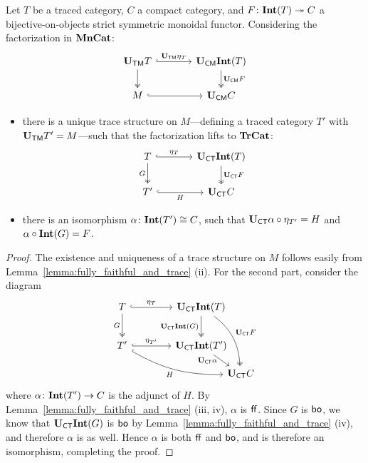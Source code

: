 \documentclass[11pt,oneside,article]{memoir}
\begin{document}
\begin{lemma}
      \label{lem:Tr_bo_Int}
   Let $T$ be a traced category, $C$ a compact category, and $F\colon\mathbf{Int}(T)\twoheadrightarrow C$ a
   bijective-on-objects strict symmetric monoidal functor. Considering the factorization in
   $\mathbf{MnCat}$:
   \[ \begin{tikzcd}[column sep=large]
      \UTM T \ar[r,hook,"\UTM\eta_{T}"] \ar[d,two heads]
         & \UCM\Int(T) \ar[d,two heads,"\UCM F"] \\
      M \ar[r,hook] & \UCM C
   \end{tikzcd} \]
   \begin{itemize}
      \item there is a unique trace structure on $M$---defining a traced category $T'$ with $\mathbf{U}_{\mathsf{TM}}
         T'=M$---such that the factorization lifts to $\mathbf{TrCat}$:
         \[ \begin{tikzcd}[column sep=large]
            T \ar[r,hook,"\eta_{T}"] \ar[d,two heads,"G"']
               & \UCT\Int(T) \ar[d,two heads,"\UCT F"] \\
            T' \ar[r,hook,"H"'] & \UCT C
         \end{tikzcd} \]
      \item there is an isomorphism $\alpha\colon\mathbf{Int}(T')\cong C$, such that $\mathbf{U}_{\mathsf{CT}}\alpha\circ
         \eta_{T'}=H$ and $\alpha\circ\mathbf{Int}(G)=F$.
   \end{itemize}
\end{lemma}
\begin{proof}
   The existence and uniqueness of a trace structure on $M$ follows easily from
   Lemma~\ref{lemma:fully_faithful_and_trace} (ii). For the second part, consider the diagram
   \[ \begin{tikzcd}[column sep=4em, row sep=5ex]
      T \ar[r,hook,"\eta_{T}"] \ar[d,two heads,"G"']
         & \UCT\Int(T) \ar[d,two heads,"\UCT\Int(G)"']
            \ar[ddr,two heads,bend left=25,"\UCT F"] &[between origins] \\
      T' \ar[r,hook,"\eta_{T'}"] \ar[drr,hook,bend right=15,"H"']
         & \UCT\Int(T') \ar[dr,"\UCT\alpha"' {inner sep=0pt,pos=.25}] & \\[-10]
      &&\UCT C
   \end{tikzcd} \]
   where $\alpha\colon\mathbf{Int}(T')\to C$ is the adjunct of $H$. By
   Lemma~\ref{lemma:fully_faithful_and_trace} (iii, iv), $\alpha$ is $\mathsf{ff}$. Since $G$ is $\mathsf{bo}$, we
   know that $\mathbf{U}_{\mathsf{CT}}\mathbf{Int}(G)$ is $\mathsf{bo}$ by Lemma~\ref{lemma:fully_faithful_and_trace} (iv), and
   therefore $\alpha$ is as well. Hence $\alpha$ is both $\mathsf{ff}$ and $\mathsf{bo}$, and is therefore an
   isomorphism, completing the proof.
\end{proof}
\end{document}
